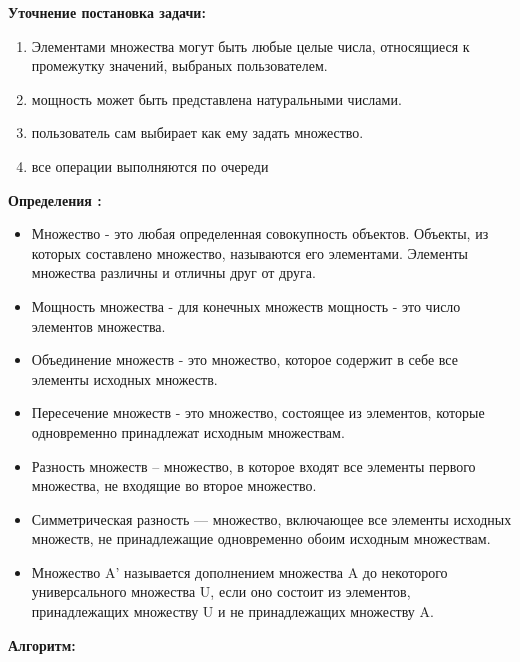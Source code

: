 \documentclass[]{article}
\begin{document}
	\large{\textbf{Уточнение постановка задачи:}}
	\begin{enumerate}[1.]
		\item Элементами множества могут быть любые целые числа, относящиеся к промежутку значений, выбраных пользователем.
		\item мощность может быть представлена натуральными числами.
		\item пользователь сам выбирает как ему задать множество.
		\item все операции выполняются по очереди
	\end{enumerate}
	\large{\textbf{Определения :}}
	\begin{itemize}
		\item Множество - это любая определенная совокупность объектов. Объекты, из которых составлено множество, называются его элементами. Элементы множества различны и отличны друг от друга.
		\item Мощность множества - для конечных множеств мощность - это число элементов множества.
		\item Объединение множеств - это множество, которое содержит в себе все элементы исходных множеств.
		\item Пересечение множеств - это множество, состоящее из элементов, которые одновременно принадлежат исходным множествам.
		\item Разность множеств – множество, в которое входят все элементы первого множества, не входящие во второе множество.
		\item Симметрическая разность — множество, включающее все элементы исходных множеств, не принадлежащие одновременно обоим исходным множествам.
		\item Множество A’ называется дополнением множества A до некоторого универсального множества U, если оно состоит из элементов, принадлежащих множеству U и не принадлежащих множеству A.
	\end{itemize}
	\large{\textbf{Алгоритм: }}
\end{document}
